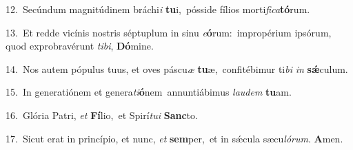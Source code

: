 {\numbfont\textcolor{\numbcolor}{12.}}~Secúndum magnitúdinem bráchi\textit{i} \textbf{tu}\-i,~\star pósside fílios morti\-\textit{fi}\-\textit{ca}\textbf{tó}rum.\par
{\numbfont\textcolor{\numbcolor}{13.}}~Et redde vicínis nostris séptuplum in sinu \textit{e}\-\textbf{ó}rum:~\star impropérium ipsórum, quod exprobravérunt \textit{ti}\-\textit{bi}, \textbf{Dó}\-mine.\par
{\numbfont\textcolor{\numbcolor}{14.}}~Nos autem pópulus tuus, et oves páscu\textit{æ} \textbf{tu}\-æ,~\star confitébimur ti\textit{bi} \textit{in} \textbf{sǽ}\-culum.\par
{\numbfont\textcolor{\numbcolor}{15.}}~In generatiónem et genera\-\textit{ti}\-\textbf{ó}nem~\star annuntiábimus \textit{lau}\-\textit{dem} \textbf{tu}\-am.\par
{\numbfont\textcolor{\numbcolor}{16.}}~Glória Patri, \textit{et} \textbf{Fí}\-lio,~\star et Spirí\-\textit{tu}\-\textit{i} \textbf{Sanc}\-to.\par
{\numbfont\textcolor{\numbcolor}{17.}}~Sicut erat in princípio, et nunc, \textit{et} \textbf{sem}\-per,~\star et in sǽcula sæcu\-\textit{ló}\-\textit{rum}. \textbf{A}\-men.\par
